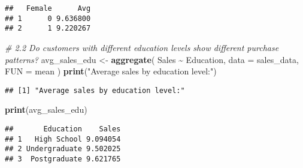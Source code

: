 \documentclass[
]{article}
\newenvironment{Shaded}{\begin{snugshade}}{\end{snugshade}}
\newcommand{\AttributeTok}[1]{\textcolor[rgb]{0.13,0.29,0.53}{#1}}
\newcommand{\CommentTok}[1]{\textcolor[rgb]{0.56,0.35,0.01}{\textit{#1}}}
\newcommand{\FunctionTok}[1]{\textcolor[rgb]{0.13,0.29,0.53}{\textbf{#1}}}
\newcommand{\NormalTok}[1]{#1}
\newcommand{\OtherTok}[1]{\textcolor[rgb]{0.56,0.35,0.01}{#1}}
\newcommand{\SpecialCharTok}[1]{\textcolor[rgb]{0.81,0.36,0.00}{\textbf{#1}}}
\newcommand{\StringTok}[1]{\textcolor[rgb]{0.31,0.60,0.02}{#1}}
\begin{document}
\begin{verbatim}
##   Female      Avg
## 1      0 9.636800
## 2      1 9.220267
\end{verbatim}

\begin{Shaded}
\begin{Highlighting}[]
\CommentTok{\# 2.2 Do customers with different education levels show different purchase patterns?}
\NormalTok{avg\_sales\_edu }\OtherTok{\textless{}{-}} \FunctionTok{aggregate}\NormalTok{(}
\NormalTok{  Sales }\SpecialCharTok{\textasciitilde{}}\NormalTok{ Education,}
  \AttributeTok{data =}\NormalTok{ sales\_data,}
  \AttributeTok{FUN  =}\NormalTok{ mean}
\NormalTok{)}
\FunctionTok{print}\NormalTok{(}\StringTok{"Average sales by education level:"}\NormalTok{)}
\end{Highlighting}
\end{Shaded}

\begin{verbatim}
## [1] "Average sales by education level:"
\end{verbatim}

\begin{Shaded}
\begin{Highlighting}[]
\FunctionTok{print}\NormalTok{(avg\_sales\_edu)}
\end{Highlighting}
\end{Shaded}

\begin{verbatim}
##       Education    Sales
## 1   High School 9.094054
## 2 Undergraduate 9.502025
## 3  Postgraduate 9.621765
\end{verbatim}

\begin{Shaded}
\end{Shaded}
\end{document}
